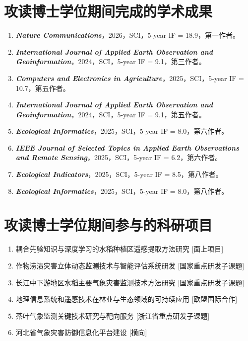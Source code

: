 \cleardoublepage
{}

\section*{攻读博士学位期间完成的学术成果}

\begin{enumerate}
    \item \textit{\textbf{Nature Communications}}，2026，SCI，5-year IF = 18.9，第一作者。

    \item \textit{\textbf{International Journal of Applied Earth Observation and Geoinformation}}，2024，SCI，5-year IF = 9.1，第三作者。

    \item \textit{\textbf{Computers and Electronics in Agriculture}}，2025，SCI，5-year IF = 10.7，第五作者。

    \item \textit{\textbf{International Journal of Applied Earth Observation and Geoinformation}}，2024，SCI，5-year IF = 9.1，第五作者。

    \item \textit{\textbf{Ecological Informatics}}，2025，SCI，5-year IF = 8.0，第六作者。

    \item \textit{\textbf{IEEE Journal of Selected Topics in Applied Earth Observations and Remote Sensing}}，2025，SCI，5-year IF = 6.2，第六作者。

    \item \textit{\textbf{Ecological Indicators}}，2025，SCI，5-year IF = 8.5，第八作者。

    \item \textit{\textbf{Ecological Informatics}}，2025，SCI，5-year IF = 8.0，第八作者。
\end{enumerate}

\section*{攻读博士学位期间参与的科研项目}

\begin{enumerate}
    \item 耦合先验知识与深度学习的水稻种植区遥感提取方法研究 [面上项目]
    \item 作物涝渍灾害立体动态监测技术与智能评估系统研发 [国家重点研发子课题]
    \item 长江中下游地区水稻主要气象灾害监测技术方法研究 [国家重点研发子课题]
    \item 地理信息系统和遥感技术在林业与生态领域的可持续应用 [欧盟国际合作]
    \item 茶叶气象监测关键技术研究与靶向服务 [浙江省重点研发子课题]
    \item 河北省气象灾害防御信息化平台建设 [横向]
\end{enumerate}